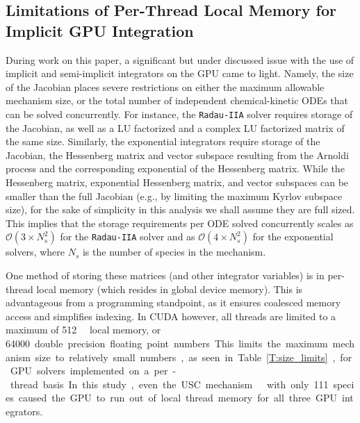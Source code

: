 \documentclass[preprint]{elsarticle}
\begin{document}
\subsection{Limitations of Per-Thread Local Memory for Implicit GPU Integration}
During work on this paper, a significant but under discussed issue with the use of implicit and semi-implicit integrators on the GPU came to light.
Namely, the size of the Jacobian places severe restrictions on either the maximum allowable mechanism size, or the total number of independent chemical-kinetic ODEs that can be solved concurrently.
For instance, the \texttt{Radau-IIA} solver requires storage of the Jacobian, as well as a LU factorized and a complex LU factorized matrix of the same size.
Similarly, the exponential integrators require storage of the Jacobian, the Hessenberg matrix and vector subspace resulting from the Arnoldi process and the corresponding exponential of the Hessenberg matrix.
While the Hessenberg matrix, exponential Hessenberg matrix, and vector subspaces can be smaller than the full Jacobian (e.g., by limiting the maximum Kyrlov subspace size), for the sake of simplicity in this analysis we shall assume they are full sized.
This implies that the storage requirements per ODE solved concurrently scales as $\mathcal{O}\left(3 \times N_s^2\right)$ for the \texttt{Radau-IIA} solver and as $\mathcal{O}\left(4 \times N_s^2\right)$ for the exponential solvers, where $N_s$ is the number of species in the mechanism.

One method of storing these matrices (and other integrator variables) is in per-thread local memory (which resides in global device memory).
This is advantageous from a programming standpoint, as it ensures coalesced memory access and simplifies indexing.
In CUDA however, all threads are limited to a maximum of \SI{512}{\kilo\byte} local memory, or \SI{64000} double precision floating point numbers.
This limits the maximum mechanism size to relatively small numbers, as seen in Table~\ref{T:size_limits}, for GPU solvers implemented on a per-thread basis.
In this study, even the USC mechanism ~\cite{Wang:2007} with only 111 species caused the GPU to run out of local thread memory for all three GPU integrators.
\end{document}
